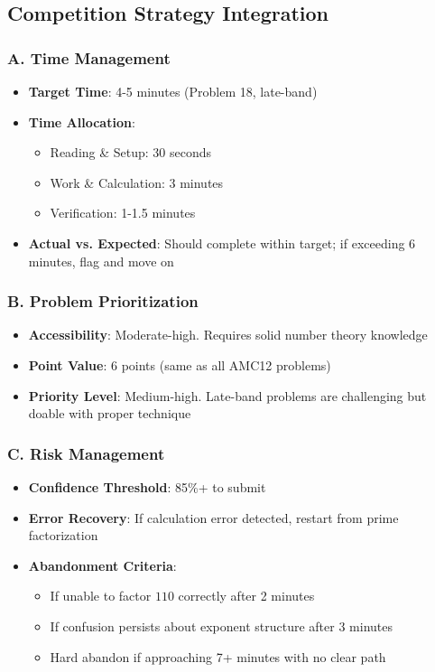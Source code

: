 \documentclass[]{article}
\begin{document}
\begin{competitionbox}
\subsection*{Competition Strategy Integration}

\subsubsection*{A. Time Management}
\begin{itemize}[leftmargin=*]
    \item \textbf{Target Time}: 4-5 minutes (Problem 18, late-band)
    \item \textbf{Time Allocation}:
    \begin{itemize}
        \item Reading \& Setup: 30 seconds
        \item Work \& Calculation: 3 minutes
        \item Verification: 1-1.5 minutes
    \end{itemize}
    \item \textbf{Actual vs. Expected}: Should complete within target; if exceeding 6 minutes, flag and move on
\end{itemize}

\subsubsection*{B. Problem Prioritization}
\begin{itemize}[leftmargin=*]
    \item \textbf{Accessibility}: Moderate-high. Requires solid number theory knowledge
    \item \textbf{Point Value}: 6 points (same as all AMC12 problems)
    \item \textbf{Priority Level}: Medium-high. Late-band problems are challenging but doable with proper technique
\end{itemize}

\subsubsection*{C. Risk Management}
\begin{itemize}[leftmargin=*]
    \item \textbf{Confidence Threshold}: 85\%+ to submit
    \item \textbf{Error Recovery}: If calculation error detected, restart from prime factorization
    \item \textbf{Abandonment Criteria}:
    \begin{itemize}
        \item If unable to factor $110$ correctly after 2 minutes
        \item If confusion persists about exponent structure after 3 minutes
        \item Hard abandon if approaching 7+ minutes with no clear path
    \end{itemize}
\end{itemize}


\end{competitionbox}
\end{document}
